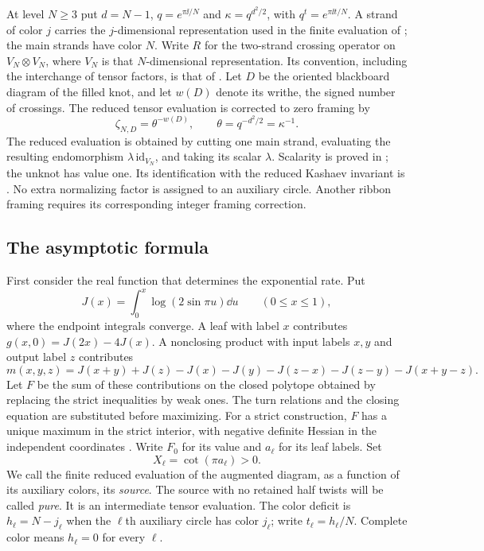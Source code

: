 At level $N\ge3$ put $d=N-1$, $q=e^{\pi\ii/N}$ and
$\kappa=q^{d^2/2}$, with $q^t=e^{\pi\ii t/N}$.
A strand of color $j$ carries the $j$-dimensional representation used
in the finite evaluation of \cite{Finite}; the main strands have color
$N$. Write $R$ for the two-strand crossing operator on
$V_N\otimes V_N$, where $V_N$ is that $N$-dimensional representation.
Its convention, including the interchange of tensor factors, is that
of \cite[Section 2]{Newton}. Let $D$ be the oriented blackboard
diagram of the filled knot, and let $w(D)$ denote its writhe, the
signed number of crossings. The reduced tensor evaluation is corrected
to zero framing by
\begin{equation}\label{ca:framing}
 \zeta_{N,D}=\theta^{-w(D)},\qquad
 \theta=q^{-d^2/2}=\kappa^{-1}.
\end{equation}
The reduced evaluation is obtained by cutting one main strand,
evaluating the resulting endomorphism $\lambda\,\mathrm{id}_{V_N}$,
and taking its scalar $\lambda$. Scalarity is proved in
\cite[Sections 9--10]{Finite}; the unknot has value one. Its identification with the reduced Kashaev
invariant is \cite[Theorem 10.1]{Finite}. No extra normalizing factor
is assigned to an auxiliary circle. Another ribbon framing requires
its corresponding integer framing correction.

\subsection{The asymptotic formula}

First consider the real function that determines the exponential rate.
Put
\[
 J(x)=\int_0^x\log(2\sin\pi u)\dd u\qquad(0\le x\le1),
\]
where the endpoint integrals converge. A leaf with label $x$ contributes
$g(x,0)=J(2x)-4J(x)$. A nonclosing product with input labels $x,y$
and output label $z$ contributes
\[
 m(x,y,z)=J(x+y)+J(z)-J(x)-J(y)
          -J(z-x)-J(z-y)-J(x+y-z).
\]
Let $F$ be the sum of these contributions on the closed polytope
obtained by replacing the strict inequalities by weak ones. The turn
relations and the closing equation are substituted before maximizing.
For a strict construction, $F$ has a unique maximum in the strict
interior, with negative definite Hessian in the independent coordinates
\cite[Theorem 6.4]{Newton}. Write $F_0$ for its value and $a_\ell$
for its leaf labels. Set
\[
 X_\ell=\cot(\pi a_\ell)>0.
\]
We call the finite reduced evaluation of the augmented diagram,
as a function of its auxiliary colors, its \emph{source}. The source
with no retained half twists will be called \emph{pure}. It is an
intermediate tensor evaluation. The color deficit is $h_\ell=N-j_\ell$
when the $\ell$th auxiliary circle has color $j_\ell$; write
$t_\ell=h_\ell/N$. Complete color means $h_\ell=0$ for every $\ell$.

